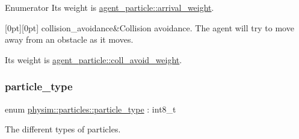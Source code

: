\begin{DoxyEnumFields}{Enumerator}
Its weight is \hyperlink{classphysim_1_1particles_1_1agent__particle_aaeb579f8b30b7604d7205bb7aff5197b}{agent\+\_\+particle\+::arrival\+\_\+weight}. \\
\hline

[0pt][0pt]{}\mbox{\label{namespacephysim_1_1particles_a033757595f7862a0fc8a389d79bf9c88aa150bf2057adbf0518b8bd2a4019d5a4}} 
collision\+\_\+avoidance&Collision avoidance. The agent will try to move away from an obstacle as it moves.

Its weight is \hyperlink{classphysim_1_1particles_1_1agent__particle_acf2c406d0b41c07d3f786701dec35020}{agent\+\_\+particle\+::coll\+\_\+avoid\+\_\+weight}. \\
\hline

\end{DoxyEnumFields}
\mbox{\label{namespacephysim_1_1particles_a068e6cda6626fbd381c07a9835425b08}} 
\subsubsection{\texorpdfstring{particle\+\_\+type}{particle\_type}}
{\footnotesize\ttfamily enum \hyperlink{namespacephysim_1_1particles_a068e6cda6626fbd381c07a9835425b08}{physim\+::particles\+::particle\+\_\+type} \+: int8\+\_\+t\hspace{0.3cm}{\ttfamily [strong]}}



The different types of particles. 

